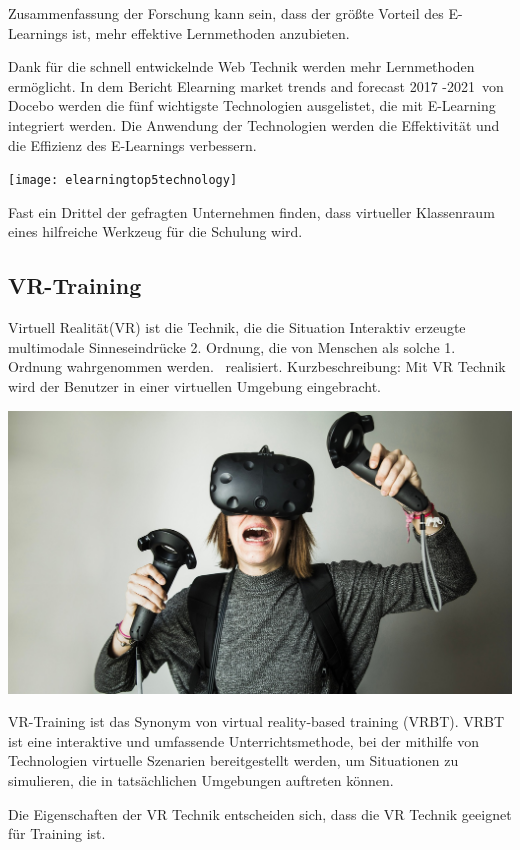 Zusammenfassung der Forschung kann sein, dass der größte Vorteil des E-Learnings ist, mehr effektive Lernmethoden anzubieten.

Dank für die schnell entwickelnde Web Technik werden mehr Lernmethoden ermöglicht. In dem Bericht \glqq Elearning market trends and forecast 2017 -2021\grqq\ von Docebo werden die fünf wichtigste Technologien ausgelistet, die mit E-Learning integriert werden. Die Anwendung der Technologien werden die Effektivität und die Effizienz des E-Learnings verbessern.

\texttt{[image: elearningtop5technology]}

Fast ein Drittel der gefragten Unternehmen finden, dass virtueller Klassenraum eines hilfreiche Werkzeug für die Schulung wird.

 \subsection{VR-Training}
 
Virtuell Realität(VR) ist die Technik, die die Situation \glqq Interaktiv erzeugte multimodale Sinneseindrücke 2. Ordnung, die von Menschen als solche 1. Ordnung wahrgenommen werden.\grqq\ \citep{9} realisiert. Kurzbeschreibung: Mit VR Technik wird der Benutzer in einer virtuellen Umgebung eingebracht.

\includegraphics[width=\textwidth]{images/vrhtcvive.jpg}

VR-Training ist das Synonym von virtual reality-based training (VRBT). \glqq VRBT ist eine interaktive und umfassende Unterrichtsmethode, bei der mithilfe von Technologien virtuelle Szenarien bereitgestellt werden, um Situationen zu simulieren, die in tatsächlichen Umgebungen auftreten können. \grqq\ \citep{14}

Die Eigenschaften der VR Technik entscheiden sich, dass die VR Technik geeignet für Training ist.

